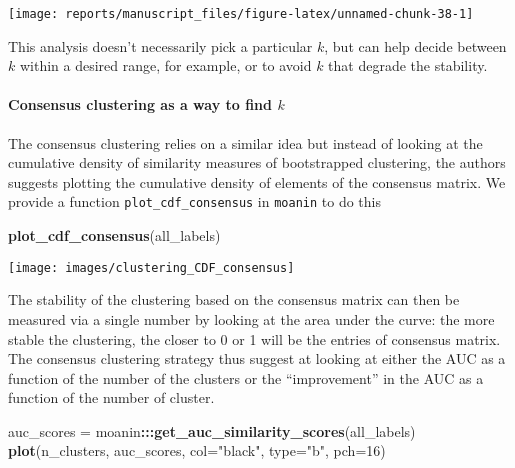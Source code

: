 \documentclass[9pt,a4paper,]{extarticle}
\newenvironment{Shaded}{\begin{snugshade}}{\end{snugshade}}
\newcommand{\DataTypeTok}[1]{\textcolor[rgb]{0.13,0.29,0.53}{#1}}
\newcommand{\DecValTok}[1]{\textcolor[rgb]{0.00,0.00,0.81}{#1}}
\newcommand{\KeywordTok}[1]{\textcolor[rgb]{0.13,0.29,0.53}{\textbf{#1}}}
\newcommand{\NormalTok}[1]{#1}
\newcommand{\OperatorTok}[1]{\textcolor[rgb]{0.81,0.36,0.00}{\textbf{#1}}}
\newcommand{\StringTok}[1]{\textcolor[rgb]{0.31,0.60,0.02}{#1}}
\begin{document}
\begin{center}\texttt{[image: reports/manuscript\_files/figure-latex/unnamed-chunk-38-1]} \end{center}

This analysis doesn't necessarily pick a particular \(k\), but can help decide between \(k\) within a desired range, for example, or to avoid \(k\) that degrade the stability.

\hypertarget{consensus-clustering-as-a-way-to-find-k}{%
\paragraph{\texorpdfstring{Consensus clustering as a way to find \(k\)}{Consensus clustering as a way to find k}}\label{consensus-clustering-as-a-way-to-find-k}}

The consensus clustering \citep{monti:consensus} relies on a similar idea but
instead of looking at the cumulative density of similarity measures of
bootstrapped clustering, the authors suggests plotting the cumulative density
of elements of the consensus matrix. We provide a function
\texttt{plot\_cdf\_consensus} in \texttt{moanin} to do this

\begin{Shaded}
\begin{Highlighting}[]
\KeywordTok{plot_cdf_consensus}\NormalTok{(all_labels)}
\end{Highlighting}
\end{Shaded}

\begin{center}\texttt{[image: images/clustering\_CDF\_consensus]} \end{center}

The stability of the clustering based on the consensus matrix can then be
measured via a single number by looking at the area under the curve: the more
stable the clustering, the closer to 0 or 1 will be the entries of consensus
matrix. The consensus clustering strategy thus suggest at looking at either
the AUC as a function of the number of the clusters or the ``improvement'' in
the AUC as a function of the number of cluster.

\begin{Shaded}
\begin{Highlighting}[]
\NormalTok{auc_scores =}\StringTok{ }\NormalTok{moanin}\OperatorTok{:::}\KeywordTok{get_auc_similarity_scores}\NormalTok{(all_labels)}
\KeywordTok{plot}\NormalTok{(n_clusters, auc_scores, }\DataTypeTok{col=}\StringTok{"black"}\NormalTok{, }\DataTypeTok{type=}\StringTok{"b"}\NormalTok{, }\DataTypeTok{pch=}\DecValTok{16}\NormalTok{)}
\end{Highlighting}
\end{Shaded}
\end{document}
